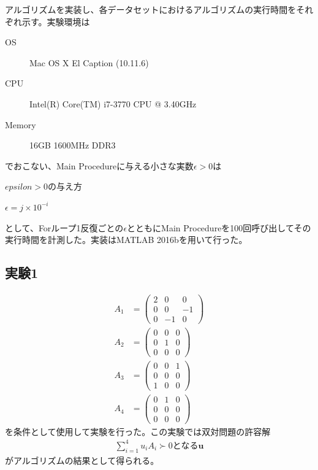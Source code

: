 アルゴリズムを実装し、各データセットにおけるアルゴリズムの実行時間をそれぞれ示す。実験環境は
\begin{description}
  \item[OS] Mac OS X El Caption (10.11.6)
  \item[CPU] Intel(R) Core(TM) i7-3770 CPU @ 3.40GHz
  \item[Memory] 16GB 1600MHz DDR3
\end{description}
でおこない、Main Procedureに与える小さな実数$\epsilon > 0$は
\begin{algorithm}
  \caption{$epsilon > 0$の与え方}
  \begin{algorithmic}
        \State $\epsilon = j \times 10^{-i}$
      \EndFor
    \EndFor
  \end{algorithmic}
\end{algorithm}
として、Forループ1反復ごとの$\epsilon$とともにMain Procedureを100回呼び出してその実行時間を計測した。実装はMATLAB 2016bを用いて行った。

\subsection{実験1}
\begin{align*}
  A_1 & = \left(
            \begin{array}{ccc}
              2 &  0 &  0 \\
              0 &  0 & -1 \\
              0 & -1 &  0
            \end{array}
          \right) \\
  A_2 & = \left(
            \begin{array}{ccc}
              0 & 0 & 0 \\
              0 & 1 & 0 \\
              0 & 0 & 0
            \end{array}
          \right) \\
  A_3 & = \left(
            \begin{array}{ccc}
              0 & 0 & 1 \\
              0 & 0 & 0 \\
              1 & 0 & 0
            \end{array}
          \right) \\
  A_4 & = \left(
            \begin{array}{ccc}
              0 & 1 & 0 \\
              0 & 0 & 0 \\
              0 & 0 & 0
            \end{array}
          \right)
\end{align*}
を条件として使用して実験を行った。この実験では双対問題の許容解
\begin{align} \label{test1-results}
  \displaystyle{\sum_{i = 1}^4} u_i A_i \succ 0\text{となる}\mathbf{u}
\end{align}
がアルゴリズムの結果として得られる。


